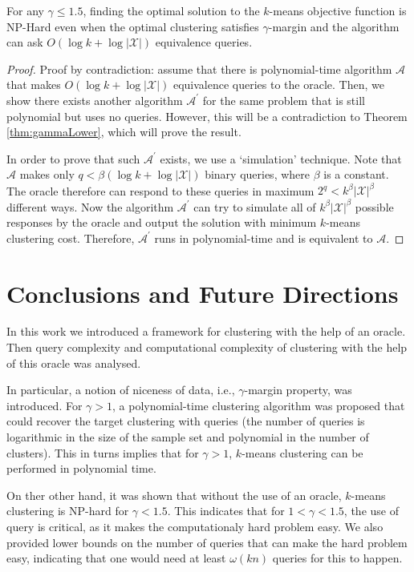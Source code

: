 \documentclass[orivec]{llncs}
\newcommand{\mc}{\mathcal}
\begin{document}
\begin{theorem}
\label{thm:queryLower}
For any $\gamma \le 1.5$, finding the optimal solution to the $k$-means objective function is NP-Hard even when the optimal clustering satisfies $\gamma$-margin and the algorithm can ask $O(\log k + \log |\mc X|)$ equivalence queries.
\end{theorem}
\begin{proof}
Proof by contradiction: assume that there is polynomial-time algorithm $\mc A$ that makes $O(\log k + \log |\mc X|)$ equivalence queries to the oracle. Then, we show there exists another algorithm $\mc A^\prime$ for the same problem that is still polynomial but uses no queries. However, this will be a contradiction to Theorem \ref{thm:gammaLower}, which will prove the result.

In order to prove that such $\mc A^\prime$ exists, we use a `simulation' technique. Note that $\mc A$ makes only $q<\beta(\log k + \log |\mc X|)$ binary queries, where $\beta$ is a constant. The oracle therefore can respond to these queries in maximum $2^{q} < k^\beta|\mc X|^\beta$ different ways. Now the algorithm $\mc A^\prime$ can try to simulate all of $k^\beta|\mc X|^\beta$ possible responses by the oracle and output the solution with minimum $k$-means clustering cost. Therefore, $\mc A^\prime$ runs in polynomial-time and is equivalent to $\mc A$.
\end{proof}


\section{Conclusions and Future Directions}
In this work we introduced a framework for clustering with the help of an oracle. Then query complexity and computational complexity of clustering with the help of this oracle was analysed. 

In particular, a notion of niceness of data, i.e., $\gamma$-margin property, was introduced. For $\gamma>1$, a polynomial-time clustering algorithm was proposed that could recover the target clustering with queries (the number of queries is logarithmic in the size of the sample set and polynomial in the number of clusters). This in turns implies that for $\gamma>1$, $k$-means clustering can be performed in polynomial time.

On ther other hand, it was shown that without the use of an oracle, $k$-means clustering is NP-hard for $\gamma < 1.5$. This indicates that for $1<\gamma<1.5$, the use of query is critical, as it makes the computationaly hard problem easy. We also provided lower bounds on the number of queries that can make the hard problem easy, indicating that one would need at least $\omega(kn)$ queries for this to happen.
\end{document}
